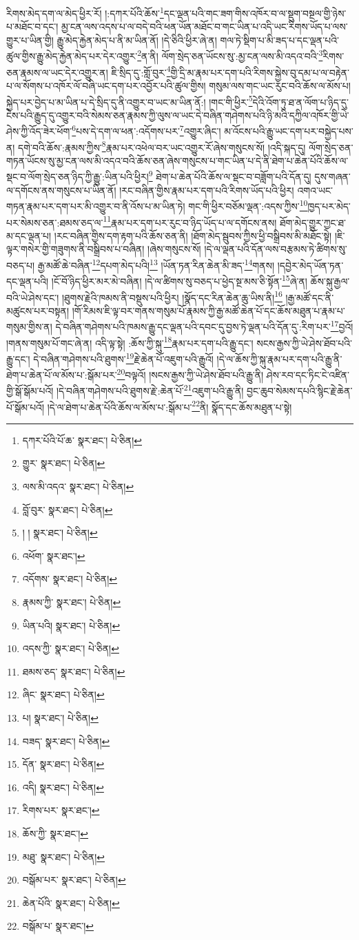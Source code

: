 རིགས་མེད་དག་ལ་མེད་ཕྱིར་རོ། །:དཀར་པོའི་ཆོས་\footnote{དཀར་པོའི་པོ་ཆ་  སྣར་ཐང་།  པེ་ཅིན། }དང་ལྡན་པའི་གང་ཟག་གིས་འཁོར་བ་ལ་སྡུག་བསྔལ་གྱི་ཉེས་པ་མཐོང་བ་དང་། མྱ་ངན་ལས་འདས་པ་ལ་བདེ་བའི་ཕན་ཡོན་མཐོང་བ་གང་ཡིན་པ་འདི་ཡང་རིགས་ཡོད་པ་ལས་གྱུར་པ་ཡིན་གྱི། རྒྱུ་མེད་རྐྱེན་མེད་པ་ནི་མ་ཡིན་ནོ། །དེ་ཅིའི་ཕྱིར་ཞེ་ན། གལ་ཏེ་སྡིག་པ་མི་ཟད་པ་དང་ལྡན་པའི་ཚུལ་གྱིས་རྒྱུ་མེད་རྐྱེན་མེད་པར་དེར་འགྱུར་\footnote{གྱུར་  སྣར་ཐང་།  པེ་ཅིན། }ན་ནི། ལོག་སྲེད་ཅན་ཡོངས་སུ་:མྱ་ངན་ལས་མི་འདའ་བའི་\footnote{ལས་མི་འདའ་  སྣར་ཐང་།  པེ་ཅིན། }རིགས་ཅན་རྣམས་ལ་ཡང་དེར་འགྱུར་ན། ཇི་སྲིད་དུ་:གློ་བུར་\footnote{བློ་བུར་  སྣར་ཐང་།  པེ་ཅིན། }གྱི་དྲི་མ་རྣམ་པར་དག་པའི་རིགས་སྐྱེས་བུ་དམ་པ་ལ་བརྟེན་པ་ལ་སོགས་པ་འཁོར་ལོ་བཞི་ཡང་དག་པར་འབྱོར་པའི་ཚུལ་གྱིས། གསུམ་ལས་གང་ཡང་རུང་བའི་ཆོས་ལ་མོས་པ། སྐྱེད་པར་བྱེད་པ་མ་ཡིན་པ་དེ་སྲིད་དུ་ནི་འགྱུར་བ་ཡང་མ་ཡིན་ནོ:། །གང་གི་ཕྱིར་\footnote{། །  སྣར་ཐང་།  པེ་ཅིན། }དེའི་འོག་ཏུ་ཐ་ན་ལོག་པ་ཉིད་དུ་ངེས་པའི་རྒྱུད་དུ་འགྱུར་བའི་སེམས་ཅན་རྣམས་ཀྱི་ལུས་ལ་ཡང་དེ་བཞིན་གཤེགས་པའི་ཉི་མའི་དཀྱིལ་འཁོར་གྱི་ཡེ་ཤེས་ཀྱི་འོད་ཟེར་ཕོག་\footnote{འཕོག་  སྣར་ཐང་། }པས་དེ་དག་ལ་ཕན་:འདོགས་པར་\footnote{འདོགས་  སྣར་ཐང་།  པེ་ཅིན། }འགྱུར་ཞིང་། མ་འོངས་པའི་རྒྱུ་ཡང་དག་པར་བསྐྱེད་པས་ན། དགེ་བའི་ཆོས་:རྣམས་ཀྱིས་\footnote{རྣམས་ཀྱི་  སྣར་ཐང་།  པེ་ཅིན། }རྣམ་པར་འཕེལ་བར་ཡང་འགྱུར་རོ་ཞེས་གསུངས་སོ། །འདི་སྐད་དུ། ལོག་སྲེད་ཅན་གཏན་ཡོངས་སུ་མྱ་ངན་ལས་མི་འདའ་བའི་ཆོས་ཅན་ཞེས་གསུངས་པ་གང་ཡིན་པ་དེ་ནི་ཐེག་པ་ཆེན་པོའི་ཆོས་ལ་སྡང་བ་ལོག་སྲེད་ཅན་ཉིད་ཀྱི་རྒྱུ་:ཡིན་པའི་ཕྱིར།\footnote{ཡིན་པའི།  སྣར་ཐང་།  པེ་ཅིན། } ཐེག་པ་ཆེན་པོའི་ཆོས་ལ་སྡང་བ་བཟློག་པའི་དོན་དུ། དུས་གཞན་ལ་དགོངས་ནས་གསུངས་པ་ཡིན་ནོ། །རང་བཞིན་གྱིས་རྣམ་པར་དག་པའི་རིགས་ཡོད་པའི་ཕྱིར། འགའ་ཡང་གཏན་རྣམ་པར་དག་པར་མི་འགྱུར་བ་ནི་འོས་པ་མ་ཡིན་ཏེ། གང་གི་ཕྱིར་བཅོམ་ལྡན་:འདས་ཀྱིས་\footnote{འདས་ཀྱི་  སྣར་ཐང་།  པེ་ཅིན། }ཁྱད་པར་མེད་པར་སེམས་ཅན་:ཐམས་ཅད་ལ་\footnote{ཐམས་ཅད་  སྣར་ཐང་།  པེ་ཅིན། }རྣམ་པར་དག་པར་རུང་བ་ཉིད་ཡོད་པ་ལ་དགོངས་ནས། ཐོག་མེད་གྱུར་ཀྱང་ཐ་མ་དང་ལྡན་པ། །རང་བཞིན་གྱིས་དག་རྟག་པའི་ཆོས་ཅན་ནི། །ཐོག་མེད་སྦུབས་ཀྱིས་ཕྱི་བསྒྲིབས་མི་མཐོང་སྟེ། །ཇི་ལྟར་གསེར་གྱི་གཟུགས་ནི་བསྒྲིབས་པ་བཞིན། །ཞེས་གསུངས་སོ། །དེ་ལ་ལྡན་པའི་དོན་ལས་བརྩམས་ཏེ་ཚིགས་སུ་བཅད་པ། རྒྱ་མཚོ་ཆེ་བཞིན་\footnote{ཞིང་  སྣར་ཐང་།  པེ་ཅིན། }དཔག་མེད་པའི།\footnote{པ།  སྣར་ཐང་།  པེ་ཅིན། } །ཡོན་ཏན་རིན་ཆེན་མི་ཟད་\footnote{བཟད་  སྣར་ཐང་།  པེ་ཅིན། }གནས། །དབྱེར་མེད་ཡོན་ཏན་དང་ལྡན་པའི། །ངོ་བོ་ཉིད་ཕྱིར་མར་མེ་བཞིན། །དེ་ལ་ཚིགས་སུ་བཅད་པ་ཕྱེད་སྔ་མས་ཅི་སྟོན་\footnote{དོན་  སྣར་ཐང་།  པེ་ཅིན། }ཞེ་ན། ཆོས་སྐུ་རྒྱལ་བའི་ཡེ་ཤེས་དང་། །ཐུགས་རྗེའི་ཁམས་ནི་བསྡུས་པའི་ཕྱིར། །སྣོད་དང་རིན་ཆེན་ཆུ་ཡིས་ནི།\footnote{འདི།  སྣར་ཐང་།  པེ་ཅིན། } །རྒྱ་མཚོ་དང་ནི་མཚུངས་པར་བསྟན། །གོ་རིམས་ཇི་ལྟ་བར་གནས་གསུམ་པོ་རྣམས་ཀྱི་རྒྱ་མཚོ་ཆེན་པོ་དང་ཆོས་མཐུན་པ་རྣམ་པ་གསུམ་གྱིས་ན། དེ་བཞིན་གཤེགས་པའི་ཁམས་རྒྱུ་དང་ལྡན་པའི་དབང་དུ་བྱས་ཏེ་ལྡན་པའི་དོན་དུ་:རིག་པར་\footnote{རིགས་པར་  སྣར་ཐང་། }བྱའོ། །གནས་གསུམ་པོ་གང་ཞེ་ན། འདི་ལྟ་སྟེ། :ཆོས་ཀྱི་སྐུ་\footnote{ཆོས་ཀྱི་  སྣར་ཐང་། }རྣམ་པར་དག་པའི་རྒྱུ་དང་། སངས་རྒྱས་ཀྱི་ཡེ་ཤེས་ཐོབ་པའི་རྒྱུ་དང་། དེ་བཞིན་གཤེགས་པའི་ཐུགས་\footnote{མཐུ་  སྣར་ཐང་།  པེ་ཅིན། }རྗེ་ཆེན་པོ་འཇུག་པའི་རྒྱུའོ། །དེ་ལ་ཆོས་ཀྱི་སྐུ་རྣམ་པར་དག་པའི་རྒྱུ་ནི་ཐེག་པ་ཆེན་པོ་ལ་མོས་པ་:སྒོམ་པར་\footnote{བསྒོམ་པར་  སྣར་ཐང་།  པེ་ཅིན། }བལྟའོ། །སངས་རྒྱས་ཀྱི་ཡེ་ཤེས་ཐོབ་པའི་རྒྱུ་ནི། ཤེས་རབ་དང་ཏིང་ངེ་འཛིན་གྱི་སྒོ་སྒོམ་པའོ། །དེ་བཞིན་གཤེགས་པའི་ཐུགས་རྗེ་:ཆེན་པོ་\footnote{ཆེན་པོའི་  སྣར་ཐང་།  པེ་ཅིན། }འཇུག་པའི་རྒྱུ་ནི། བྱང་ཆུབ་སེམས་དཔའི་སྙིང་རྗེ་ཆེན་པོ་སྒོམ་པའོ། །དེ་ལ་ཐེག་པ་ཆེན་པོའི་ཆོས་ལ་མོས་པ་:སྒོམ་པ་\footnote{བསྒོམ་པ་  སྣར་ཐང་། }ནི། སྣོད་དང་ཆོས་མཐུན་པ་སྟེ། 